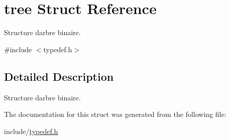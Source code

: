 \hypertarget{structtree}{}\section{tree Struct Reference}
\label{structtree}


Structure d\textquotesingle{}arbre binaire.  




{\ttfamily \#include $<$typedef.\+h$>$}



\subsection{Detailed Description}
Structure d\textquotesingle{}arbre binaire. 

The documentation for this struct was generated from the following file\+:\begin{DoxyCompactItemize}
\item 
include/\hyperlink{typedef_8h}{typedef.\+h}\end{DoxyCompactItemize}
